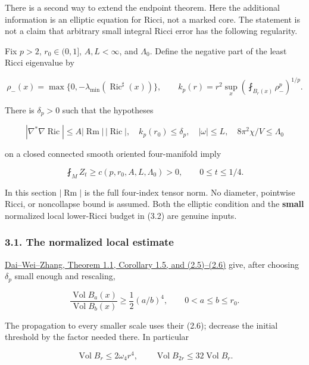 \documentclass[
  10pt,
]{article}
\begin{document}
There is a second way to extend the endpoint theorem. Here the
additional information is an elliptic equation for Ricci, not a marked
core. The statement is not a claim that arbitrary small integral Ricci
error has the following regularity.

Fix \(p>2\), \(r_0\in(0,1]\), \(A,L<\infty\), and \(\Lambda_0\). Define
the negative part of the least Ricci eigenvalue by

\[
 \rho_-(x)=\max\{0,-\lambda_{\min}(\operatorname{Ric}^{\sharp}(x))\},
 \qquad k_p(r)=r^2\sup_x
                  \left(\fint_{B_r(x)}\rho_-^p\right)^{1/p}.
                                                        \tag{3.1}
\]

There is \(\delta_p>0\) such that the hypotheses

\[
 |\nabla^*\nabla\operatorname{Ric}|
              \le A|\operatorname{Rm}|\,|\operatorname{Ric}|,
 \quad k_p(r_0)\le\delta_p,
 \quad |\omega|\le L,
 \quad 8\pi^2\chi/V\le\Lambda_0                       \tag{3.2}
\]

on a closed connected smooth oriented four-manifold imply

\[
                  \boxed{\fint_M Z_t\ge c(p,r_0,A,L,\Lambda_0)>0,}
                  \qquad 0\le t\le1/4.             \tag{3.3}
\]

In this section \(|\operatorname{Rm}|\) is the full four-index tensor
norm. No diameter, pointwise Ricci, or noncollapse bound is assumed.
Both the elliptic condition and the \textbf{small} normalized local
lower-Ricci budget in (3.2) are genuine inputs.

\hypertarget{the-normalized-local-estimate}{%
\subsubsection{3.1. The normalized local
estimate}\label{the-normalized-local-estimate}}

\href{https://web.math.ucsb.edu/~wei/paper/Dai-Wei-Zhang.pdf}{Dai--Wei--Zhang,
Theorem 1.1, Corollary 1.5, and (2.5)--(2.6)} give, after choosing
\(\delta_p\) small enough and rescaling,

\[
 \frac{\operatorname{Vol}B_a(x)}{\operatorname{Vol}B_b(x)}
                 \ge\frac12(a/b)^4,
                 \qquad 0<a\le b\le r_0.           \tag{3.4}
\]

The propagation to every smaller scale uses their (2.6); decrease the
initial threshold by the factor needed there. In particular

\[
 \operatorname{Vol}B_r\le2\omega_4r^4,
 \qquad \operatorname{Vol}B_{2r}\le32\operatorname{Vol}B_r.
                                                        \tag{3.5}
\]
\end{document}
